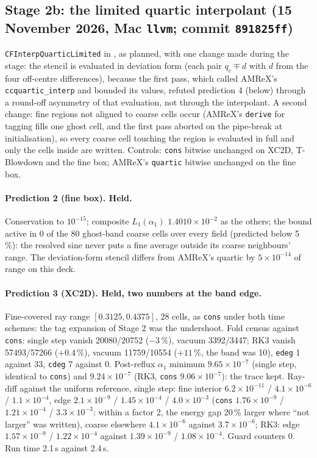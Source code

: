 \documentclass[11pt,a4paper]{article}
\newcommand{\code}[1]{\texttt{\small #1}}
\begin{document}
\subsection{Stage 2b: the limited quartic interpolant (15 November 2026, Mac \code{llvm}; commit \code{891825ff})}
\label{sec:stage2b}

\code{CFInterpQuarticLimited} in , as
planned, with one change made during the stage: the stencil is evaluated
in deviation form (each pair $q_c \mp d$ with $d$ from the four
off-centre differences), because the first pass, which called AMReX's
\code{ccquartic\_interp} and bounded its values, refuted prediction 4
(below) through a round-off asymmetry of that evaluation, not through
the interpolant.  A second change: fine regions not aligned to coarse
cells occur (AMReX's \code{derive} for tagging fills one ghost cell, and
the first pass aborted on the pipe-break at initialisation), so every
coarse cell touching the region is evaluated in full and only the cells
inside are written.  Controls: \code{cons} bitwise unchanged on XC2D,
T-Blowdown and the fine box; AMReX's \code{quartic} bitwise unchanged on
the fine box.

\paragraph{Prediction 2 (fine box).  Held.}  Conservation to
$10^{-15}$; composite $L_1(\alpha_1)$ $1.4010\times10^{-2}$ as the
others; the bound active in 0 of the 80 ghost-band coarse cells over
every field (predicted below 5\,\%): the resolved sine never puts a fine
average outside its coarse neighbours' range.  The deviation-form stencil
differs from AMReX's quartic by $5\times10^{-14}$ of range on this deck.

\paragraph{Prediction 3 (XC2D).  Held, two numbers at the band edge.}
Fine-covered ray range $[0.3125, 0.4375]$, 28 cells, as \code{cons}
under both time schemes: the tag expansion of Stage 2 was the undershoot.
Fold census against \code{cons}: single step vanish 20080/20752
($-3\,\%$), vacuum 3392/3447; RK3 vanish 57493/57266 ($+0.4\,\%$), vacuum
11759/10554 ($+11\,\%$, the band was 10), \code{edeg} 1 against 33,
\code{cdeg} 7 against 0.  Post-reflux $\alpha_1$ minimum $9.65\times10^{-7}$
(single step, identical to \code{cons}) and $9.24\times10^{-7}$ (RK3,
\code{cons} $9.06\times10^{-7}$): the trace kept.  Ray-diff against the
uniform reference, single step: fine interior $6.2\times10^{-11}$ /
$4.1\times10^{-6}$ / $1.1\times10^{-4}$, edge $2.1\times10^{-9}$ /
$1.45\times10^{-4}$ / $4.0\times10^{-3}$ (\code{cons} $1.76\times10^{-9}$
/ $1.21\times10^{-4}$ / $3.3\times10^{-3}$: within a factor 2, the energy
gap 20\,\% larger where ``not larger'' was written), coarse elsewhere
$4.1\times10^{-6}$ against $3.7\times10^{-6}$; RK3: edge
$1.57\times10^{-9}$ / $1.22\times10^{-4}$ against $1.39\times10^{-9}$ /
$1.08\times10^{-4}$.  Guard counters 0.  Run time 2.1\,s against 2.4\,s.
\end{document}

